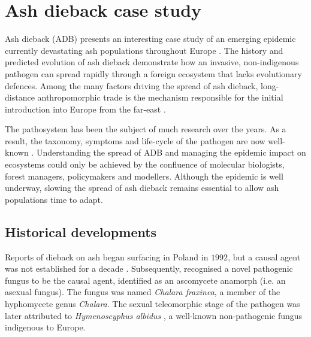 \newpage
\section{Ash dieback case study}




\label{ch2:ash-dieback}
Ash dieback (ADB) presents an interesting case study of an emerging epidemic currently devastating ash
populations throughout Europe \cite{enderle2019overview}. The history and predicted evolution of ash dieback
demonstrate how an invasive, non-indigenous pathogen can spread rapidly through a foreign ecosystem that 
lacks evolutionary defences. Among the many factors driving the spread of ash dieback, long-distance 
anthropomorphic trade is the mechanism responsible for the initial introduction into Europe from the
far-east \cite{zhao2013hymenoscyphus, queloz2011cryptic}.

The pathosystem has been the subject of much research over the years. As a result, the taxonomy, 
symptoms and life-cycle of the pathogen are  now well-known \cite{https://doi.org/10.1111/mpp.12073}. 
Understanding the spread of ADB and managing the epidemic impact on ecosystems could only be achieved
by the confluence of molecular biologists, forest managers, policymakers and modellers. Although the epidemic
is well underway, slowing the spread of ash dieback remains essential to allow ash populations time to adapt.

\subsection{Historical developments}

Reports of dieback on ash began surfacing in Poland in $1992$, but a causal agent was not established
for a decade \cite{kowalski2001zamieraniu, coetsee2000xenochalara}. Subsequently, \cite{kowalski2006chalara} 
recognised a novel pathogenic fungus to be the causal agent, identified as an ascomycete anamorph (i.e. an asexual fungus).
The fungus was named \textit{Chalara fraxinea}, a member of the hyphomycete genus \textit{Chalara}. 
The sexual teleomorphic stage of the pathogen was later attributed to \textit{Hymenoscyphus albidus} 
\cite{kowalski2009teleomorph}, a well-known non-pathogenic fungus indigenous to Europe.

